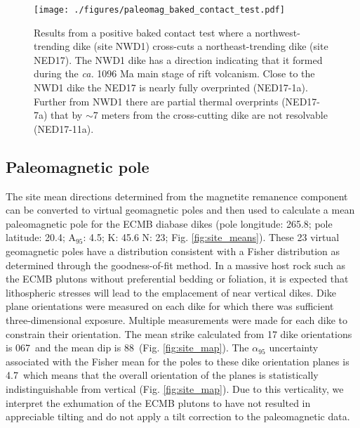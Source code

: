 \documentclass[draft]{agujournal2019}
\begin{document}
\begin{figure}[!ht]
\noindent\texttt{[image: ./figures/paleomag\_baked\_contact\_test.pdf]}
\caption{\small{Results from a positive baked contact test where a northwest-trending dike (site NWD1) cross-cuts a northeast-trending dike (site NED17). The NWD1 dike has a direction indicating that it formed during the \textit{ca.} 1096 Ma main stage of rift volcanism. Close to the NWD1 dike the NED17 is nearly fully overprinted (NED17-1a). Further from NWD1 there are partial thermal overprints (NED17-7a) that by $\sim$7 meters from the cross-cutting dike are not resolvable (NED17-11a).}}
\label{fig:baked_contact}
\end{figure}

\subsection{Paleomagnetic pole}

The site mean directions determined from the magnetite remanence component can be converted to virtual geomagnetic poles and then used to calculate a mean paleomagnetic pole for the ECMB diabase dikes (pole longitude: 265.8; pole latitude: 20.4; A$_{95}$: 4.5; K: 45.6 N: 23; Fig. \ref{fig:site_means}). These 23 virtual geomagnetic poles have a distribution consistent with a Fisher distribution as determined through the  goodness-of-fit method. In a massive host rock such as the ECMB plutons without preferential bedding or foliation, it is expected that lithospheric stresses will lead to the emplacement of near vertical dikes. Dike plane orientations were measured on each dike for which there was sufficient three-dimensional exposure. Multiple measurements were made for each dike to constrain their orientation. The mean strike calculated from 17 dike orientations is 067\textdegree\ and the mean dip is 88\textdegree\ (Fig. \ref{fig:site_map}). The $\alpha_{95}$ uncertainty associated with the Fisher mean for the poles to these dike orientation planes is 4.7\textdegree\ which means that the overall orientation of the planes is statistically indistinguishable from vertical (Fig. \ref{fig:site_map}). Due to this verticality, we interpret the exhumation of the ECMB plutons to have not resulted in appreciable tilting and do not apply a tilt correction to the paleomagnetic data.
\end{document}
